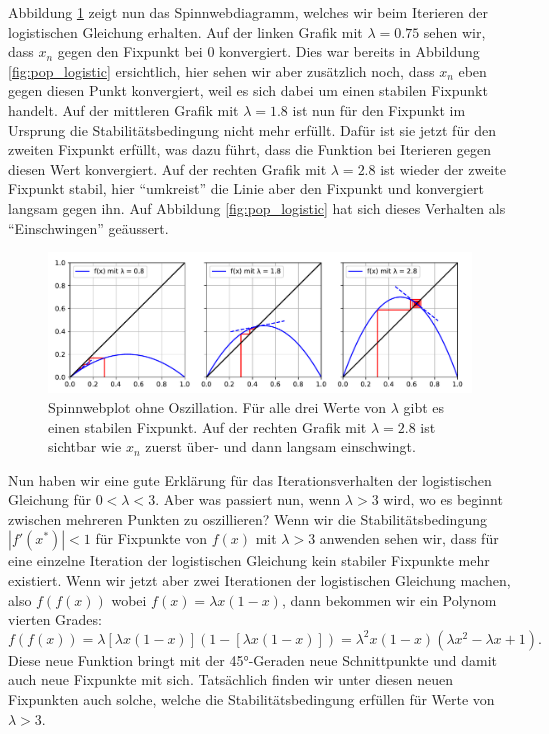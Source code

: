 Abbildung \ref{fig:web_1} zeigt nun das Spinnwebdiagramm,
welches wir beim Iterieren der logistischen Gleichung erhalten.  
Auf der linken Grafik mit $\lambda = 0.75$ sehen wir,
dass $x_n$ gegen den Fixpunkt bei $0$ konvergiert. 
Dies war bereits in Abbildung \ref{fig:pop_logistic} ersichtlich,
hier sehen wir aber zusätzlich noch, dass $x_n$ eben gegen
diesen Punkt konvergiert, weil es sich dabei um einen
stabilen Fixpunkt handelt.  
Auf der mittleren Grafik mit $\lambda = 1.8$ ist nun für den
Fixpunkt im Ursprung die Stabilitätsbedingung nicht
mehr erfüllt. 
Dafür ist sie jetzt für den zweiten Fixpunkt erfüllt, 
was dazu führt, dass die Funktion bei Iterieren gegen 
diesen Wert konvergiert.  
Auf der rechten Grafik mit $\lambda = 2.8$ ist wieder der  
zweite Fixpunkt stabil, hier ``umkreist'' die Linie aber
den Fixpunkt und konvergiert langsam gegen ihn. 
Auf Abbildung \ref{fig:pop_logistic} hat sich dieses Verhalten
als ``Einschwingen'' geäussert.
\begin{figure}
    \includegraphics[width=\linewidth]{papers/logistic/figures/web_1.pdf}
    \caption{
        Spinnwebplot ohne Oszillation.
        Für alle drei Werte von $\lambda$ gibt es 
        einen stabilen Fixpunkt. 
        Auf der rechten Grafik mit $\lambda = 2.8$
        ist sichtbar wie $x_n$ 
        zuerst über- und dann langsam einschwingt.
    }
    \label{fig:web_1}
\end{figure}

Nun haben wir eine gute Erklärung für das Iterationsverhalten
der logistischen Gleichung für $0 < \lambda < 3$. 
Aber was passiert nun, wenn $\lambda > 3$ wird,
wo es beginnt zwischen mehreren Punkten zu oszillieren?
Wenn wir die Stabilitätsbedingung $|f'(x^*)| < 1$
für Fixpunkte von $f(x)$ mit $\lambda > 3$ anwenden sehen wir,
dass für eine einzelne Iteration der logistischen 
Gleichung kein stabiler Fixpunkte mehr existiert. 
Wenn wir jetzt aber zwei Iterationen der logistischen
Gleichung machen, also 
$f(f(x))$ wobei $f(x)=\lambda x (1-x)$,
dann bekommen wir ein Polynom vierten Grades:
\begin{equation}
    f(f(x))
    =
    \lambda [\lambda x (1-x)] (1-[\lambda x (1-x)])
    =
    \lambda^2 x (1-x) (\lambda x^2 - \lambda x + 1).
\end{equation}
Diese neue Funktion bringt mit der 45°-Geraden 
neue Schnittpunkte und damit auch neue Fixpunkte mit sich.
Tatsächlich finden wir unter diesen neuen Fixpunkten 
auch solche, welche die Stabilitätsbedingung erfüllen für
Werte von $\lambda > 3$.

